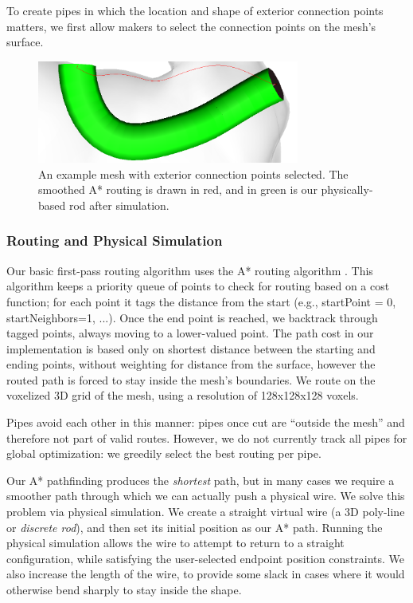To create pipes in which the location and shape of exterior connection points matters, we first allow makers to select the connection points on the mesh's surface.

\begin{figure}[h!]
\centering
    \includegraphics[width=3.4in]{figures/exterior.png}
\caption{An example mesh with exterior connection points selected.  The smoothed A* routing is drawn in {\color{red}red}, and in {\color{tovi}green} is our physically-based rod after simulation.}
\label{fig:tool-process-exterior}
\end{figure}

\subsubsection{Routing and Physical Simulation}

Our basic first-pass routing algorithm uses the A* routing algorithm \cite{Hart-Astar}.  This algorithm keeps a priority queue of points to check for routing based on a cost function; for each point it tags the distance from the start (e.g., startPoint = 0, startNeighbors=1, ...).  Once the end point is reached, we backtrack through tagged points, always moving to a lower-valued point.  The path cost in our implementation is based only on shortest distance between the starting and ending points, without weighting for distance from the surface, however the routed path is forced to stay inside the mesh's boundaries.  We route on the voxelized 3D grid of the mesh, using a resolution of 128x128x128 voxels. 

Pipes avoid each other in this manner: pipes once cut are ``outside the mesh'' and therefore not part of valid routes.  However, we do not currently track all pipes for global optimization: we greedily select the best routing per pipe.

Our A* pathfinding produces the \emph{shortest} path, but in many cases
we require a smoother path through which we can actually push a physical wire.
We solve this problem via physical simulation. We create a straight virtual 
wire (a 3D poly-line or \emph{discrete rod}), and then set its initial position 
as our A* path.
Running the physical simulation allows the wire to attempt to return to
a straight configuration, while satisfying the user-selected endpoint position constraints.
We also increase the length of the wire, to provide some slack in cases where 
it would otherwise bend sharply to stay inside the shape. 

